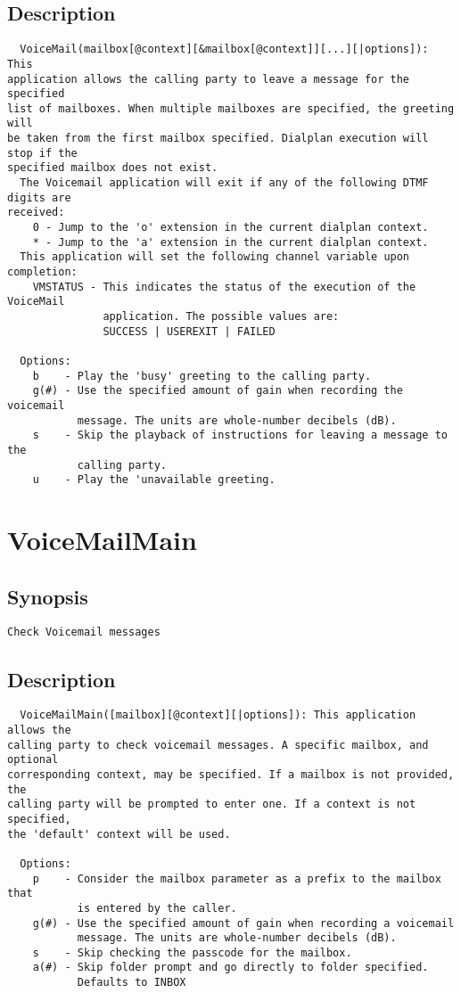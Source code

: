 \subsection{Description}
\begin{verbatim}
  VoiceMail(mailbox[@context][&mailbox[@context]][...][|options]): This
application allows the calling party to leave a message for the specified
list of mailboxes. When multiple mailboxes are specified, the greeting will
be taken from the first mailbox specified. Dialplan execution will stop if the
specified mailbox does not exist.
  The Voicemail application will exit if any of the following DTMF digits are
received:
    0 - Jump to the 'o' extension in the current dialplan context.
    * - Jump to the 'a' extension in the current dialplan context.
  This application will set the following channel variable upon completion:
    VMSTATUS - This indicates the status of the execution of the VoiceMail
               application. The possible values are:
               SUCCESS | USEREXIT | FAILED

  Options:
    b    - Play the 'busy' greeting to the calling party.
    g(#) - Use the specified amount of gain when recording the voicemail
           message. The units are whole-number decibels (dB).
    s    - Skip the playback of instructions for leaving a message to the
           calling party.
    u    - Play the 'unavailable greeting.

\end{verbatim}


\section{VoiceMailMain}
\subsection{Synopsis}
\begin{verbatim}
Check Voicemail messages
\end{verbatim}
\subsection{Description}
\begin{verbatim}
  VoiceMailMain([mailbox][@context][|options]): This application allows the
calling party to check voicemail messages. A specific mailbox, and optional
corresponding context, may be specified. If a mailbox is not provided, the
calling party will be prompted to enter one. If a context is not specified,
the 'default' context will be used.

  Options:
    p    - Consider the mailbox parameter as a prefix to the mailbox that
           is entered by the caller.
    g(#) - Use the specified amount of gain when recording a voicemail
           message. The units are whole-number decibels (dB).
    s    - Skip checking the passcode for the mailbox.
    a(#) - Skip folder prompt and go directly to folder specified.
           Defaults to INBOX

\end{verbatim}


